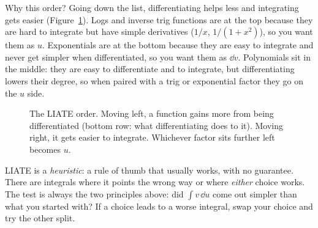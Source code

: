 Why this order? Going down the list, differentiating helps less and integrating
gets easier (Figure~\ref{ch23:fig-liate}). Logs and inverse trig functions are at
the top because they are hard to integrate but have simple derivatives
($1/x$, $1/(1+x^2)$), so you want them as $u$. Exponentials are at the bottom
because they are easy to integrate and never get simpler when differentiated, so
you want them as $\dd v$. Polynomials sit in the middle: they are easy to
differentiate and to integrate, but differentiating lowers their degree, so when
paired with a trig or exponential factor they go on the $u$ side.

\begin{figure}[htbp]
\centering
{}
\caption{The LIATE order. Moving left, a function gains more from being
differentiated (bottom row: what differentiating does to it). Moving right, it
gets easier to integrate. Whichever factor sits further left becomes $u$.}
\label{ch23:fig-liate}
\end{figure}

\begin{trapbox}
LIATE is a \emph{heuristic}: a rule of thumb that usually works, with no
guarantee. There are integrals where it points the wrong way or where
\emph{either} choice works. The test is always the two principles
above: did $\int v\,\dd u$ come out simpler than what you started with? If a
choice leads to a worse integral, swap your choice and try the other split.
\end{trapbox}

